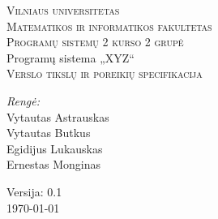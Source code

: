 \begin{titlepage}

  \begin{center}


    \textsc{%
    \Large Vilniaus universitetas\\
    Matematikos ir informatikos fakultetas\\
    Programų sistemų 2 kurso 2 grupė}\\[6.0cm]

    { \huge Programų sistema „XYZ“ }\\[0.5cm]

    \textsc{\Large Verslo tikslų ir poreikių specifikacija }\\[4.0cm]

    \begin{minipage}[]{0.8\textwidth}
      \begin{flushright} \large
        \emph{Rengė:} \\
        Vytautas Astrauskas \\
        Vytautas Butkus \\
        Egidijus Lukauskas \\
        Ernestas Monginas
      \end{flushright}
    \end{minipage}

    \vfill

    {\large  Versija: 0.1 \\ \today }
  \end{center}
  
\end{titlepage}

